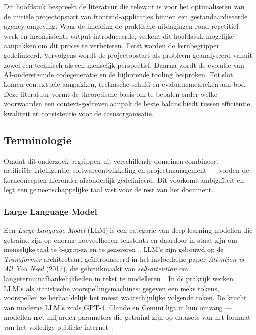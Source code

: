 \chapter{}
\label{ch:stand-van-zaken}

Dit hoofdstuk bespreekt de literatuur die relevant is voor het optimaliseren van de initiële projectopstart van frontend-applicaties binnen een gestandaardiseerde agency-omgeving. Waar de inleiding de praktische uitdagingen rond repetitief werk en inconsistente output introduceerde, verkent dit hoofdstuk mogelijke aanpakken om dit proces te verbeteren. Eerst worden de kernbegrippen gedefinieerd. Vervolgens wordt de projectopstart als probleem geanalyseerd vanuit zowel een technisch als een menselijk perspectief. Daarna wordt de evolutie van AI-ondersteunde codegeneratie en de bijhorende tooling besproken. Tot slot komen contextuele aanpakken, technische schuld en evaluatiemetrieken aan bod. Deze literatuur vormt de theoretische basis om te bepalen onder welke voorwaarden een context-gedreven aanpak de beste balans biedt tussen efficiëntie, kwaliteit en consistentie voor de casusorganisatie.

\section{Terminologie}
\label{sec:terminologie}

Omdat dit onderzoek begrippen uit verschillende domeinen combineert --- artificiële intelligentie, softwareontwikkeling en projectmanagement --- worden de kernconcepten hieronder afzonderlijk gedefinieerd. Dit voorkomt ambiguïteit en legt een gemeenschappelijke taal vast voor de rest van het document.

\subsection{Large Language Model}
\label{subsec:llm}

Een \textit{Large Language Model} (LLM) is een categorie van deep learning-modellen die getraind zijn op enorme hoeveelheden tekstdata en daardoor in staat zijn om menselijke taal te begrijpen en te genereren~\autocite{IBMThink2021}. LLM's zijn gebouwd op de \textit{Transformer}-architectuur, geïntroduceerd in het invloedrijke paper \textit{Attention is All You Need} (2017), die gebruikmaakt van \textit{self-attention} om langetermijnafhankelijkheden in tekst te modelleren~\autocite{GoogleML2024}. In de praktijk werken LLM's als statistische voorspellingsmachines: gegeven een reeks tokens, voorspellen ze herhaaldelijk het meest waarschijnlijke volgende token. De kracht van moderne LLM's zoals GPT-4, Claude en Gemini ligt in hun omvang --- modellen met miljarden parameters die getraind zijn op datasets van het formaat van het volledige publieke internet~\autocite{AWSCloud2024}.

